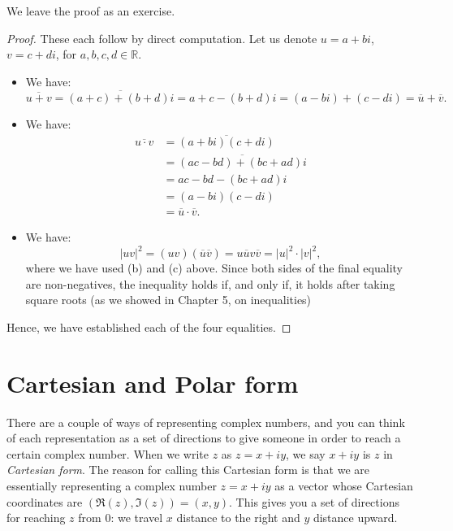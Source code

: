 \documentclass[11pt,dvipsnames]{book}
\numberwithin{equation}{section} %
\numberwithin{figure}{section} %
\numberwithin{table}{section} %
\begin{document}
We leave the proof as an exercise.\\


\begin{solution}

\begin{proof}
These each follow by direct computation.  Let us denote $u=a+bi$, $v=c+di$, for $a,b,c,d\in\mathbb{R}$.
\begin{itemize}
\item We have:
$$\overline{u+v} = \overline{(a+c) + (b+d)i} = a+c - (b+d)i = (a-bi) + (c-di) = \overline{u} + \overline{v}.$$
\item We have:
\begin{align*}
\overline{u\cdot v} 
& = \overline{(a+bi)(c+di)}\\
&  = \overline{(ac-bd) + (bc+ad)i} \\
& = ac-bd - (bc+ad)i \\
& = (a-bi)(c-di) \\
& = \overline{u}\cdot\overline{v}.
\end{align*}

\item We have:
$$|uv|^2 = (uv)(\overline{u}\overline{v}) = u\overline{u}v\overline{v} = |u|^2\cdot|v|^2,$$
where we have used (b) and (c) above.  Since both sides of the final equality are non-negatives, the inequality holds if, and only if, it holds after taking square roots (as we showed in Chapter 5, on inequalities)
\end{itemize}
Hence, we have established each of the four equalities.\end{proof}
\end{solution}









\section{Cartesian and Polar form}

There are a couple of ways of representing complex numbers, and you can think of each representation as a set of directions to give someone in order to reach a certain complex number. When we write $z$ as $z=x+iy$, we say $x+iy$ is $z$ in {\it Cartesian form}. The reason for calling this Cartesian form is that we are essentially representing a complex number $z=x+iy$ as a vector whose Cartesian coordinates are $(\Re(z),\Im(z))=(x,y)$. This gives you  a set of directions for reaching $z$ from $0$: we travel $x$ distance to the right and $y$ distance upward.
\end{document}
